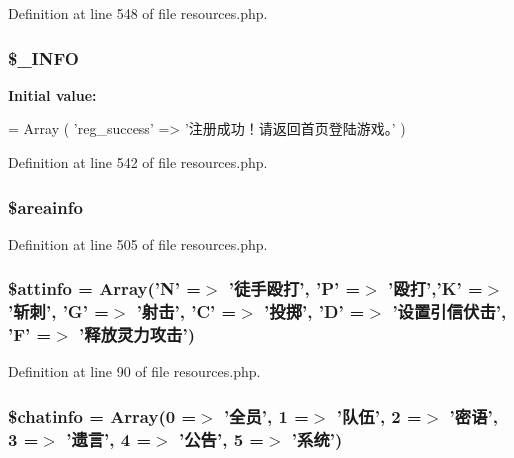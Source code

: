 Definition at line 548 of file resources.\+php.

\hypertarget{resources_8php_acc171a42cb2c06ea14b041fc55b5cc24}{
\subsubsection[{\$\+\_\+\+I\+N\+F\+O}]{\setlength{\rightskip}{0pt plus 5cm}\$\+\_\+\+I\+N\+F\+O}}\label{resources_8php_acc171a42cb2c06ea14b041fc55b5cc24}
{\bfseries Initial value\+:}
\begin{DoxyCode}
= Array
    (
    \textcolor{stringliteral}{'reg\_success'} => \textcolor{stringliteral}{'注册成功！请返回首页登陆游戏。'}
    )
\end{DoxyCode}


Definition at line 542 of file resources.\+php.

\hypertarget{resources_8php_aabf13bd9fe14d8a463c5f4b334361291}{
\subsubsection[{\$areainfo}]{\setlength{\rightskip}{0pt plus 5cm}\$areainfo}}\label{resources_8php_aabf13bd9fe14d8a463c5f4b334361291}


Definition at line 505 of file resources.\+php.

\hypertarget{resources_8php_a92eb8a09b2b4554f7502c542f0cdf0d6}{
\subsubsection[{\$attinfo}]{\setlength{\rightskip}{0pt plus 5cm}\$attinfo = Array('N' =$>$ '徒手殴打', 'P' =$>$ '殴打','K' =$>$ '斩刺', 'G' =$>$ '射击', 'C' =$>$ '投掷', 'D' =$>$ '设置引信伏击', 'F' =$>$ '释放灵力攻击')}}\label{resources_8php_a92eb8a09b2b4554f7502c542f0cdf0d6}


Definition at line 90 of file resources.\+php.

\hypertarget{resources_8php_abcea2ccdba90758edbd052712f3b2cec}{
\subsubsection[{\$chatinfo}]{\setlength{\rightskip}{0pt plus 5cm}\$chatinfo = Array(0 =$>$ '全员', 1 =$>$ '队伍', 2 =$>$ '密语', 3 =$>$ '遗言', 4 =$>$ '公告', 5 =$>$ '系统')}}\label{resources_8php_abcea2ccdba90758edbd052712f3b2cec}


